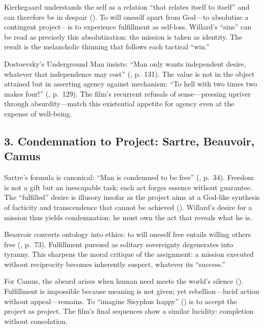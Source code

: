 {Kierkegaard understands the self as a relation ``that relates itself to itself'' and can therefore be in despair (\parencite[pp.~49--52]{KierkegaardSUD1980}). To will oneself apart from God---to absolutize a contingent project---is to experience fulfillment as self-loss. Willard’s ``sins'' can be read as precisely this absolutization: the mission is taken as identity. The result is the melancholic thinning that follows each tactical ``win.''

Dostoevsky’s Underground Man insists: ``Man only wants independent desire, whatever that independence may cost'' (\parencite{DostoevskyNFU1994}, p.~131). The value is not in the object attained but in asserting agency against mechanism: ``To hell with two times two makes four!'' (\parencite{DostoevskyNFU1994}, p.~129). The film’s recurrent refusals of sense---pressing upriver through absurdity---match this existential appetite for agency even at the expense of well-being.

\subsection*{3. Condemnation to Project: Sartre, Beauvoir, Camus}

Sartre’s formula is canonical: ``Man is condemned to be free'' (\parencite{SartreBN2003}, p.~34). Freedom is not a gift but an inescapable task; each act forges essence without guarantee. The ``fulfilled'' desire is illusory insofar as the project aims at a God-like synthesis of facticity and transcendence that cannot be achieved (\parencite[p.~604]{SartreBN2003}). Willard’s desire for a mission thus yields condemnation: he must own the act that reveals what he is.

Beauvoir converts ontology into ethics: to will oneself free entails willing others free (\parencite{Beauvoir1976}, p.~73). Fulfillment pursued as solitary sovereignty degenerates into tyranny. This sharpens the moral critique of the assignment: a mission executed without reciprocity becomes inherently suspect, whatever its ``success.''

For Camus, the absurd arises when human need meets the world’s silence (\parencite[p.~28]{CamusMyth1991}). Fulfillment is impossible because meaning is not given; yet rebellion---lucid action without appeal---remains. To ``imagine Sisyphus happy'' (\parencite[p.~123]{CamusMyth1991}) is to accept the project as project. The film’s final sequences show a similar lucidity: completion without consolation.

}
